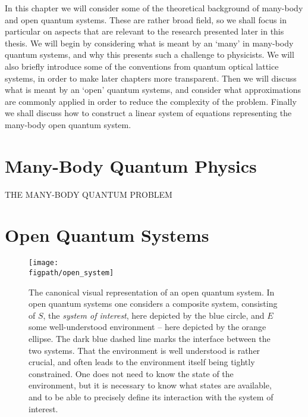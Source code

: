 In this chapter we will consider some of the theoretical background of many-body and open quantum systems. These are rather broad field, so we shall focus in particular on aspects that are relevant to the research presented later in this thesis. We will begin by considering what is meant by an `many' in many-body quantum systems, and why this presents such a challenge to physicists. We will also briefly introduce some of the conventions from quantum optical lattice systems, in order to make later chapters more transparent. Then we will discuss what is meant by an `open' quantum systems, and consider what approximations are commonly applied in order to reduce the complexity of the problem. Finally we shall discuss how to construct a linear system of equations representing the many-body open quantum system.  

\section{Many-Body Quantum Physics}
THE MANY-BODY QUANTUM PROBLEM

\section{Open Quantum Systems}

\begin{figure}[ht!]
\centering
\texttt{[image: \\figpath/open\_system]}
\caption{The canonical visual representation of an open quantum system. In open quantum systems one considers a composite system, consisting of \(S\), the \emph{system of interest}, here depicted by the blue circle, and \(E\) some well-understood environment -- here depicted by the orange ellipse. The dark blue dashed line marks the interface between the two systems. That the environment is well understood is rather crucial, and often leads to the environment itself being tightly constrained. One does not need to know the state of the environment, but it is necessary to know what states are available, and to be able to precisely define its interaction with the system of interest.}
\label{fig:oqs1-1}
\end{figure}